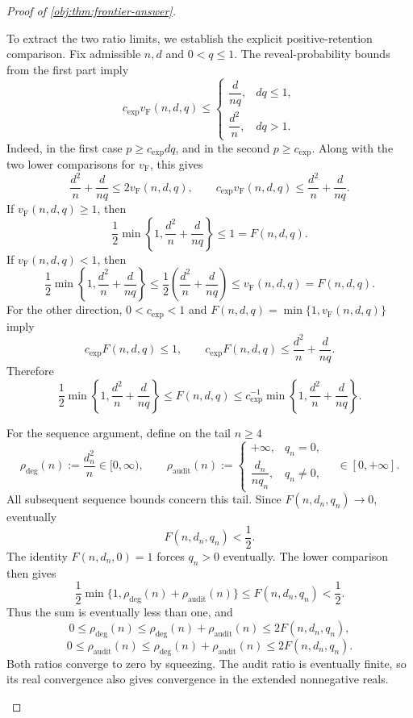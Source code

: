 \documentclass[11pt]{article}
\begin{document}
\begin{proof}[Proof of \cref{obj:thm:frontier-answer}]
\begin{enumerate}
To extract the two ratio limits, we establish the explicit positive-retention comparison. Fix admissible \(n,d\) and \(0<q\le1\). The reveal-probability bounds from the first part imply
\[
c_{\mathrm{exp}}v_{\mathrm{F}}(n,d,q)
\le
\begin{cases}
\dfrac{d}{nq},&dq\le1,\\[4pt]
\dfrac{d^2}{n},&dq>1.
\end{cases}
\]
Indeed, in the first case \(p\ge c_{\mathrm{exp}}dq\), and in the second
\(p\ge c_{\mathrm{exp}}\). Along with the two lower comparisons for
\(v_{\mathrm{F}}\), this gives
\[
\frac{d^2}{n}+\frac{d}{nq}\le2v_{\mathrm{F}}(n,d,q),
\qquad
c_{\mathrm{exp}}v_{\mathrm{F}}(n,d,q)
\le\frac{d^2}{n}+\frac{d}{nq}.
\]
If \(v_{\mathrm{F}}(n,d,q)\ge1\), then
\[
\frac12\min\left\{1,\frac{d^2}{n}+\frac{d}{nq}\right\}
\le1=F(n,d,q).
\]
If \(v_{\mathrm{F}}(n,d,q)<1\), then
\[
\frac12\min\left\{1,\frac{d^2}{n}+\frac{d}{nq}\right\}
\le\frac12\left(\frac{d^2}{n}+\frac{d}{nq}\right)
\le v_{\mathrm{F}}(n,d,q)=F(n,d,q).
\]
For the other direction, \(0<c_{\mathrm{exp}}<1\) and
\(F(n,d,q)=\min\{1,v_{\mathrm{F}}(n,d,q)\}\) imply
\[
c_{\mathrm{exp}}F(n,d,q)\le1,
\qquad
c_{\mathrm{exp}}F(n,d,q)
\le\frac{d^2}{n}+\frac{d}{nq}.
\]
Therefore
\[
\frac12\min\left\{1,\frac{d^2}{n}+\frac{d}{nq}\right\}
\le F(n,d,q)
\le
c_{\mathrm{exp}}^{-1}
\min\left\{1,\frac{d^2}{n}+\frac{d}{nq}\right\}.
\]

For the sequence argument, define on the tail \(n\ge4\)
\[
\rho_{\mathrm{deg}}(n):=\frac{d_n^2}{n}\in[0,\infty),
\qquad
\rho_{\mathrm{audit}}(n):=
\begin{cases}
+\infty,&q_n=0,\\[2pt]
\dfrac{d_n}{nq_n},&q_n\ne0,
\end{cases}
\quad\in[0,+\infty].
\]
All subsequent sequence bounds concern this tail. Since \(F(n,d_n,q_n)\to0\), eventually
\[
F(n,d_n,q_n)<\frac12.
\]
The identity \(F(n,d_n,0)=1\) forces \(q_n>0\) eventually. The lower comparison then gives
\[
\frac12\min\{1,\rho_{\mathrm{deg}}(n)+\rho_{\mathrm{audit}}(n)\}
\le F(n,d_n,q_n)<\frac12.
\]
Thus the sum is eventually less than one, and
\[
0\le\rho_{\mathrm{deg}}(n)
\le\rho_{\mathrm{deg}}(n)+\rho_{\mathrm{audit}}(n)
\le2F(n,d_n,q_n),
\]
\[
0\le\rho_{\mathrm{audit}}(n)
\le\rho_{\mathrm{deg}}(n)+\rho_{\mathrm{audit}}(n)
\le2F(n,d_n,q_n).
\]
Both ratios converge to zero by squeezing. The audit ratio is eventually finite, so its real convergence also gives convergence in the extended nonnegative reals.


\end{enumerate}
\end{proof}
\end{document}
